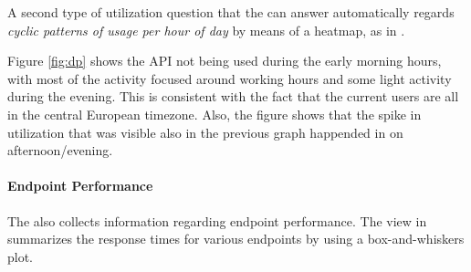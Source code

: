 \documentclass{sig-alternate-05-2015}
\begin{document}
\niceseparator


A second type of utilization question that the \tool can answer automatically regards {\em cyclic patterns of usage per hour of day} by means of a heatmap, as in . 




Figure \ref{fig:dp} shows the API not being used during the early morning hours, with most of the activity focused around working hours and some light activity during the evening. This is consistent with the fact that the current users are all in the central European timezone. Also, the figure shows that the spike in utilization that was visible also in the previous graph happended in on afternoon/evening.

\paragraph{Endpoint Performance}
\label{sec:perf}

  The \tool also collects information regarding endpoint performance. The view in  summarizes the response times for various endpoints by using a box-and-whiskers plot. 


\end{document}
